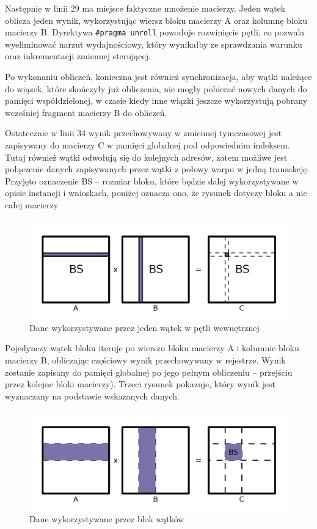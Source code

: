 \documentclass[12pt,a4paper]{article}
\begin{document}
Następnie w linii 29 ma miejsce faktyczne mnożenie macierzy. Jeden wątek oblicza jeden wynik, wykorzystując wiersz bloku macierzy A oraz kolumnę bloku macierzy B. Dyrektywa \verb|#pragma unroll| powoduje rozwinięcie pętli, co pozwala wyeliminować narzut wydajnościowy, który wynikałby ze sprawdzania warunku oraz inkrementacji zmiennej sterującej.

Po wykonaniu obliczeń, konieczna jest również synchronizacja, aby wątki należące do wiązek, które skończyły już obliczenia, nie mogły pobierać nowych danych do pamięci współdzielonej, w czasie kiedy inne wiązki jeszcze wykorzystują pobrany wcześniej fragment macierzy B do obliczeń.

Ostatecznie w linii 34 wynik przechowywany w zmiennej tymczasowej jest zapisywany do macierzy C w pamięci globalnej pod odpowiednim indeksem. Tutaj również wątki odwołują się do kolejnych adresów, zatem możliwe jest połączenie danych zapisywanych przez wątki z połowy warpu w jedną transakcję.\\


{\footnotesize Przyjęto oznaczenie BS -- rozmiar bloku, które będzie dalej wykorzystywane w opisie instancji i wnioskach, poniżej oznacza ono, że rysunek dotyczy bloku a nie całej macierzy}
\vspace{-0.3cm}
\begin{figure}[H]
  \centering
  \includegraphics[width=0.95\linewidth, trim={0 50px 0 90px}, clip=true]{images/2.jpg}
  \caption{Dane wykorzystywane przez jeden wątek w pętli wewnętrznej}
  \label{fig:matrix2}
\end{figure}
Pojedynczy wątek bloku iteruje po wierszu bloku macierzy A i kolumnie bloku macierzy B, obliczając częściowy wynik przechowywany w rejestrze. Wynik zostanie zapisany do pamięci globalnej po jego pełnym obliczeniu -- przejściu przez kolejne bloki macierzy). Trzeci rysunek pokazuje, który wynik jest wyznaczany na podstawie wskazanych danych.


\begin{figure}[H]
  \centering
  \includegraphics[width=0.95\linewidth, trim={0 50px 0 90px}, clip=true]{images/1.jpg}
  \caption{Dane wykorzystywane przez blok wątków}
  \label{fig:matrix1}
\end{figure}
\end{document}
